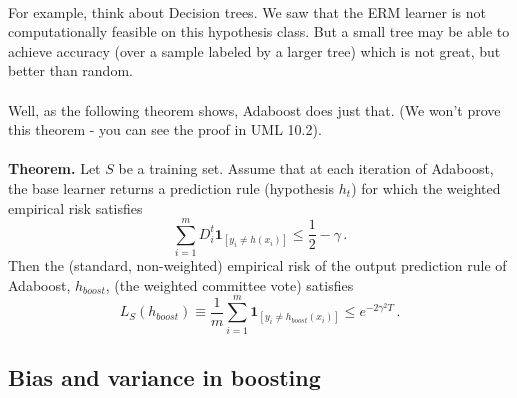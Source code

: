 \documentclass[11pt]{article}
\newcommand{\Ac}{\mathcal{A}}
\newcommand{\Hc}{\mathcal{H}}
\begin{document}
~\\
For example, think about Decision trees. We saw that the ERM learner is not
computationally feasible on this hypothesis class. But a small tree may be able
to achieve accuracy (over a sample labeled by a larger tree)
which is not great, but better than random.
\\~\\
Well, as the following theorem shows, Adaboost does just that. (We won't prove
this theorem - you can see the proof in UML 10.2).
\\~\\
{\bf Theorem.} Let $S$ be a training set. 
Assume that at each iteration of
Adaboost, the base learner returns a prediction rule (hypothesis $h_t$) for which the
weighted empirical risk satisfies
\[
  \sum_{i=1}^m D^{t}_i\mathbf{1}_{[y_i \neq h(x_i)]} \leq \frac{1}{2}-\gamma\,.
\]
Then the (standard, non-weighted) 
empirical risk of the output prediction rule of Adaboost,
$h_{boost}$, (the weighted committee
vote) satisfies
\[
  L_S(h_{boost}) \equiv \frac{1}{m}\sum_{i=1}^m \mathbf{1}_{[y_i 
  \neq h_{boost}(x_i)]} \leq e^{-2\gamma^2 T }\,.
\]

%
%


%
\subsection{Bias and variance in boosting}
\end{document}
